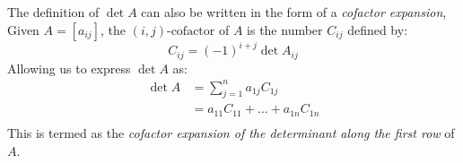 \documentclass[12pt letter]{report}
\begin{document}
The definition of $\det A$ can also be written in the form of a \textit{cofactor expansion}, Given $A = \left[ a_{ij}
    \right] $, the $ \left( i, j \right)\text{-cofactor} $ of $A$ is the number $C_{ij}$ defined by:
\[
  C_{ij} = \left( -1 \right)^{i+j} \det A_{ij}
\]
Allowing us to express $\det A$ as:
\begin{align*}
  \det A & = \displaystyle\sum_{j=1}^{n} a_{1j} C_{1j} \\
         & = a_{11} C_{11} + \ldots + a_{1n} C_{1n}    \\
\end{align*}
This is termed as the \textit{cofactor expansion of the determinant along the first row} of $A$.

\end{document}
